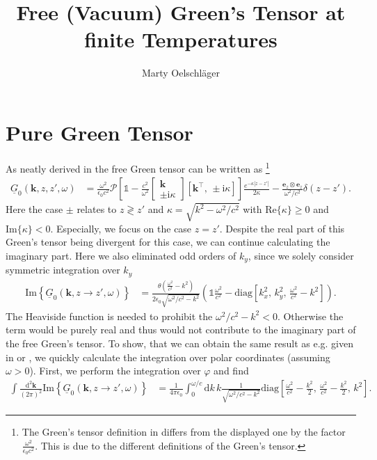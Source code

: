 \documentclass[11pt]{article}
\title{Free (Vacuum) Green's Tensor at finite Temperatures}
\author{Marty Oelschläger}
\newcommand{\vv}[1]{\mathbf{#1}}
\newcommand{\ii}[0]{\mathrm{i}}
\newcommand{\dd}[0]{\mathrm{d}}
\begin{document}
\maketitle
\section{Pure Green Tensor}
As neatly derived in \cite{amorim2017} the free Green tensor can be written as
\footnote{The Green's tensor definition in \cite{amorim2017} differs from the displayed one by the factor $\frac{\omega^2}{\epsilon_0c^2}$. This is due to the different definitions of the Green's tensor.}
\begin{align}
  \underline{G}_0(\vv k, z,z',\omega) &=
  \frac{\omega^2}{\epsilon_0c^2}
  \mathcal{P}\left[
    \mathbb{1}-\frac{c^2}{\omega^2}
    \begin{bmatrix}
      \vv k \\ \pm\ii \kappa
    \end{bmatrix}
    \left[ \vv k^\intercal ,\,\pm\ii\kappa\right]
  \right]
  \frac{e^{-\kappa|z-z'|}}{2\kappa}
  -\frac{\vv e_z\otimes\vv e_z}{\omega^2/c^2}\delta(z-z')
  .
\end{align}
Here the case $\pm$ relates to $z\gtrless z'$ and $\kappa=\sqrt{k^2-\omega^2/c^2}$ with $\mathrm{Re}\{\kappa\}\geq0$ and $\mathrm{Im}\{\kappa\}<0$. Especially, we focus on the case $z=z'$. Despite the real part of this Green's tensor being divergent for this case, we can continue calculating the imaginary part. Here we also eliminated odd orders of $k_y$, since we solely consider symmetric integration over $k_y$
%
\begin{align}
  \mathrm{Im}\left\{\underline{G}_0(\vv k, z\to z',\omega)\right\} &=
  \frac{
  \theta(\frac{\omega^2}{c^2}-k^2)
}{2\epsilon_0\sqrt{\omega^2/c^2-k^2}}
  \left(
    \mathbb{1}\frac{\omega^2}{c^2} -
    \mathrm{diag}\left[
      k_x^2,\,k_y^2,\,\frac{\omega^2}{c^2}-k^2
    \right]
  \right)
  .
\end{align}
The Heaviside function is needed to prohibit the $\omega^2/c^2 -k^2 <0$. Otherwise the term would be purely real and thus would not contribute to the imaginary part of the free Green's tensor. To show, that we can obtain the same result as e.g. given in \cite{buhmann2012b} or \cite{intravaia2016b}, we quickly calculate the integration over polar coordinates (assuming $\omega>0$). First, we perform the integration over $\varphi$ and find
%
\begin{align}
  \int \frac{\dd^2\vv k}{(2\pi)^2} 
  \mathrm{Im}\left\{\underline{G}_0(\vv k, z\to z',\omega)\right\} &=
  \frac{1}{4\pi\epsilon_0}
  \int_0^{\omega/c} \dd k \,k
  \frac{1
}{\sqrt{\omega^2/c^2-k^2}}
    \mathrm{diag}\left[
     \frac{\omega^2}{c^2}-  \frac{k^2}{2},\,\frac{\omega^2}{c^2}-\frac{k^2}{2},\,k^2
    \right]
  .
\end{align}
\end{document}
